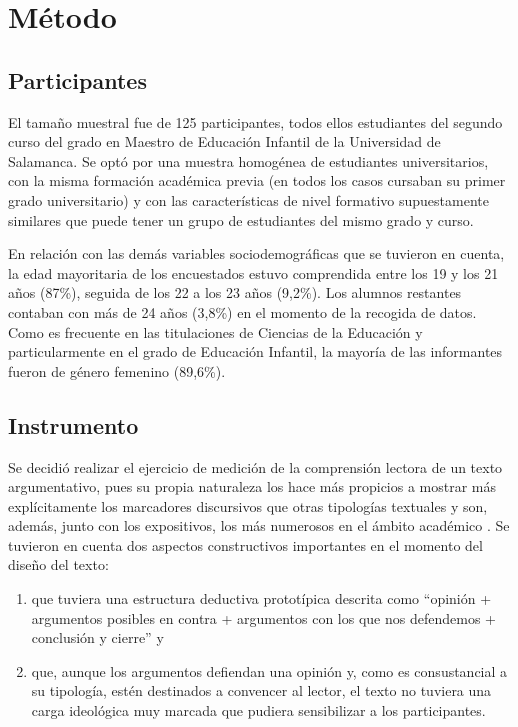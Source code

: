 \documentclass[spanish]{textolivre}
\begin{document}
\section{Método}

\subsection{Participantes}

El tamaño muestral fue de 125 participantes, todos ellos estudiantes del segundo curso del grado en Maestro de Educación Infantil de la Universidad de Salamanca. Se optó por una muestra homogénea de estudiantes universitarios, con la misma formación académica previa (en todos los casos cursaban su primer grado universitario) y con las características de nivel formativo supuestamente similares que puede tener un grupo de estudiantes del mismo grado y curso.

En relación con las demás variables sociodemográficas que se tuvieron en cuenta, la edad mayoritaria de los encuestados estuvo comprendida entre los 19 y los 21 años (87\%), seguida de los 22 a los 23 años (9,2\%). Los alumnos restantes contaban con más de 24 años (3,8\%) en el momento de la recogida de datos. Como es frecuente en las titulaciones de Ciencias de la Educación y particularmente en el grado de Educación Infantil, la mayoría de las informantes fueron de género femenino (89,6\%).


\subsection{Instrumento}

Se decidió realizar el ejercicio de medición de la comprensión lectora de un texto argumentativo, pues su propia naturaleza los hace más propicios a mostrar más explícitamente los marcadores discursivos que otras tipologías textuales y son, además, junto con los expositivos, los más numerosos en el ámbito académico \cite{martin-macho-harrison_uso_2022}. Se tuvieron en cuenta dos aspectos constructivos importantes en el momento del diseño del texto: \begin{enumerate}
    \item que tuviera una estructura deductiva prototípica descrita como “opinión + argumentos posibles en contra + argumentos con los que nos defendemos + conclusión y cierre” \cite{martinezsanchez2011conectores} y
    \item que, aunque los argumentos defiendan una opinión y, como es consustancial a su tipología, estén destinados a convencer al lector, el texto no tuviera una carga ideológica muy marcada que pudiera sensibilizar a los participantes.
\end{enumerate} 
\end{document}
